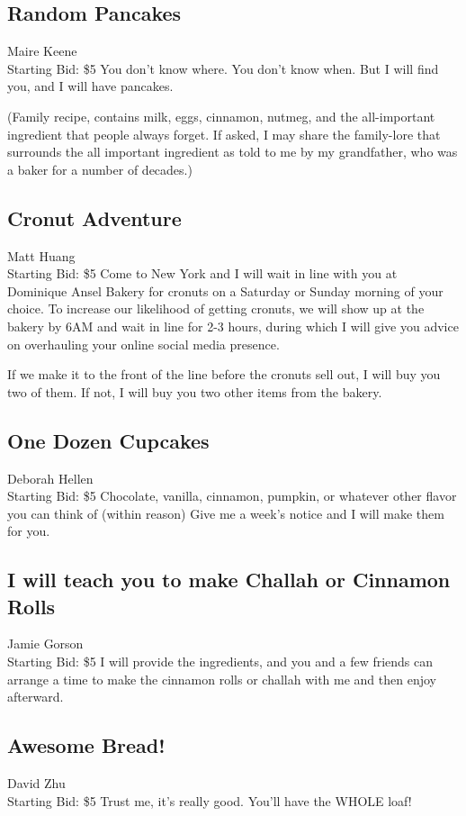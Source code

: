 \documentclass[11pt]{article}
\begin{document}
\subsection{Random Pancakes}
Maire Keene
\\
Starting Bid: \$5
\newline
You don't know where.
You don't know when.
But I will find you,
and I will have pancakes.

(Family recipe, contains milk, eggs, cinnamon, nutmeg, and the all-important ingredient that people always forget. If asked, I may share the family-lore that surrounds the all important ingredient as told to me by my grandfather, who was a baker for a number of decades.)
\subsection{Cronut Adventure}
Matt Huang
\\
Starting Bid: \$5
\newline
Come to New York and I will wait in line with you at Dominique Ansel Bakery for cronuts on a Saturday or Sunday morning of your choice. To increase our likelihood of getting cronuts, we will show up at the bakery by 6AM and wait in line for 2-3 hours, during which I will give you advice on overhauling your online social media presence.

If we make it to the front of the line before the cronuts sell out, I will buy you two of them. If not, I will buy you two other items from the bakery.
\subsection{One Dozen Cupcakes}
Deborah Hellen
\\
Starting Bid: \$5
\newline
Chocolate, vanilla, cinnamon, pumpkin, or whatever other flavor you can think of (within reason)
Give me a week's notice and I will make them for you.
\subsection{I will teach you to make Challah or Cinnamon Rolls}
Jamie Gorson
\\
Starting Bid: \$5
\newline
I will provide the ingredients, and you and a few friends can arrange a time to make the cinnamon rolls or challah with me and then enjoy afterward.
\subsection{Awesome Bread!}
David Zhu
\\
Starting Bid: \$5
\newline
Trust me, it's really good. You'll have the WHOLE loaf!
\end{document}
